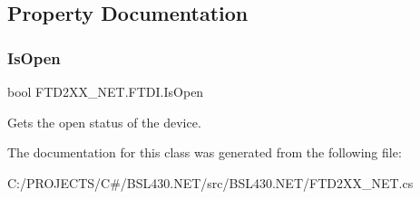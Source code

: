 \subsection{Property Documentation}
\mbox{\label{class_f_t_d2_x_x___n_e_t_1_1_f_t_d_i_ad6918818625bceacf7623d2d792b80ec}} 
\subsubsection{\texorpdfstring{IsOpen}{IsOpen}}
{\footnotesize\ttfamily bool F\+T\+D2\+X\+X\+\_\+\+N\+E\+T.\+F\+T\+D\+I.\+Is\+Open\hspace{0.3cm}{\ttfamily [get]}}



Gets the open status of the device. 



The documentation for this class was generated from the following file\+:\begin{DoxyCompactItemize}
\item 
C\+:/\+P\+R\+O\+J\+E\+C\+T\+S/\+C\#/\+B\+S\+L430.\+N\+E\+T/src/\+B\+S\+L430.\+N\+E\+T/F\+T\+D2\+X\+X\+\_\+\+N\+E\+T.\+cs\end{DoxyCompactItemize}
